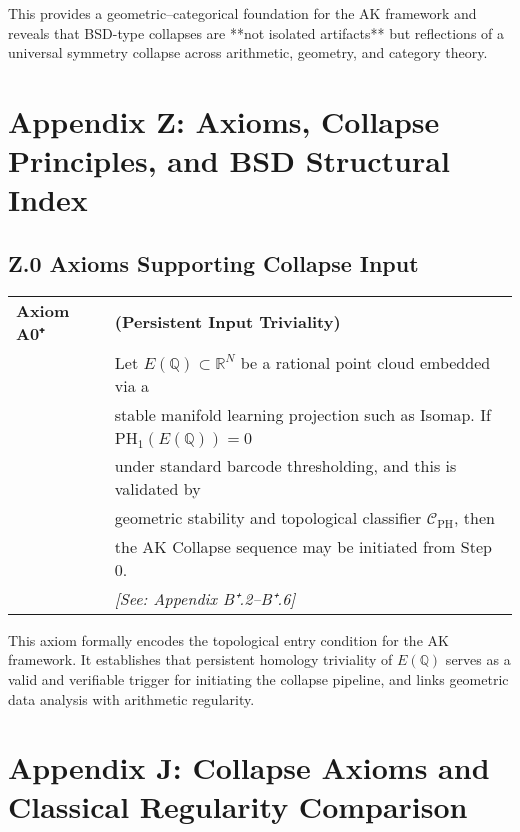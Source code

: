 This provides a geometric–categorical foundation for the AK framework  
and reveals that BSD-type collapses are **not isolated artifacts**  
but reflections of a universal symmetry collapse across arithmetic, geometry, and category theory.




\section*{Appendix Z: Axioms, Collapse Principles, and BSD Structural Index}

\subsection*{Z.0 Axioms Supporting Collapse Input}

\begin{tabular}{ll}
\textbf{Axiom A0⁺} & \textbf{(Persistent Input Triviality)} \\
& Let \( E(\mathbb{Q}) \subset \mathbb{R}^N \) be a rational point cloud embedded via a \\
& stable manifold learning projection such as Isomap. If \\
& \quad \( \mathrm{PH}_1(E(\mathbb{Q})) = 0 \) \\
& under standard barcode thresholding, and this is validated by \\
& geometric stability and topological classifier \( \mathcal{C}_{\mathrm{PH}} \), then \\
& the AK Collapse sequence may be initiated from Step 0. \\
& \textit{[See: Appendix B⁺.2–B⁺.6]}
\end{tabular}

\vspace{1em}
\noindent
This axiom formally encodes the topological entry condition for the AK framework.  
It establishes that persistent homology triviality of \( E(\mathbb{Q}) \) serves as a valid and verifiable trigger  
for initiating the collapse pipeline, and links geometric data analysis with arithmetic regularity.



\section*{Appendix J: Collapse Axioms and Classical Regularity Comparison}


